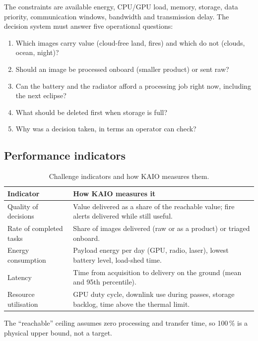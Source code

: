 \documentclass[11pt,a4paper]{article}
\begin{document}
The constraints are available energy, CPU/GPU load, memory, storage, data priority, communication
windows, bandwidth and transmission delay. The decision system must answer five operational questions:
\begin{enumerate}
  \item Which images carry value (cloud-free land, fires) and which do not (clouds, ocean, night)?
  \item Should an image be processed onboard (smaller product) or sent raw?
  \item Can the battery and the radiator afford a processing job right now, including the next eclipse?
  \item What should be deleted first when storage is full?
  \item Why was a decision taken, in terms an operator can check?
\end{enumerate}

\subsection{Performance indicators}
\begin{table}[H]
\centering
\caption{Challenge indicators and how KAIO measures them.}
\small
\begin{tabularx}{\textwidth}{@{}l X@{}}
\toprule
\textbf{Indicator} & \textbf{How KAIO measures it} \\
\midrule
Quality of decisions & Value delivered as a share of the reachable value; fire alerts delivered while still useful. \\
Rate of completed tasks & Share of images delivered (raw or as a product) or triaged onboard. \\
Energy consumption & Payload energy per day (GPU, radio, laser), lowest battery level, load-shed time. \\
Latency & Time from acquisition to delivery on the ground (mean and 95th percentile). \\
Resource utilisation & GPU duty cycle, downlink use during passes, storage backlog, time above the thermal limit. \\
\bottomrule
\end{tabularx}
\end{table}
{\footnotesize\color{kmuted} The ``reachable'' ceiling assumes zero processing and transfer time, so 100\,\% is a physical upper bound, not a target.}
\end{document}
